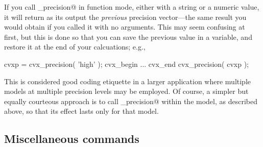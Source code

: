 \documentclass[12pt]{article}
\begin{document}
If you call \verb@cvx_precision@ in function mode, either with a string or a numeric
value, it will return as its output the \emph{previous} precision vector---the same
result you would obtain if you called it with no arguments. This may
seem confusing at first, but this is done so that you can save the previous value
in a variable, and restore it at the end of your calcuations; e.g.,
\begin{code}
	cvxp = cvx_precision( 'high' );
	cvx_begin
		...
	cvx_end
	cvx_precision( cvxp );
\end{code}
This is considered good coding etiquette in a larger application where multiple 
\cvx models at multiple precision levels may be employed. Of course, a simpler but
equally courteous approach is to call \verb@cvx_precision@ within the \cvx
model, as described above, so that its effect lasts only for that model.

\subsection{Miscellaneous \cvx commands}
\label{sec:misc}
\end{document}
